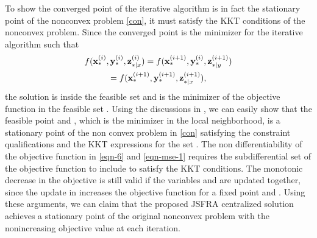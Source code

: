 To show the converged point of the iterative algorithm is in fact the stationary point of the nonconvex problem \eqref{con}, it must satisfy the \ac{KKT} conditions of the nonconvex problem. Since the converged point is the minimizer for the iterative algorithm such that 
\begin{multline} \label{con-opt}
f(\iter{\mx}{\ast}{i},\iter{\my}{\ast}{i},\iter{\mz}{\ast|x}{i}) = f(\iter{\mx}{\ast}{i+1},\iter{\my}{\ast}{i},\iter{\mz}{\ast|y}{i+1}) \\ = 
f(\iter{\mx}{\ast}{i+1},\iter{\my}{\ast}{i+1},\iter{\mz}{\ast|x}{i+1}),
\end{multline}
the solution is inside the feasible set  and  is the minimizer of the objective function  in the feasible set . Using the discussions in \cite{marks1978technical}, we can easily show that the feasible point  and , which is the minimizer in the local neighborhood, is a stationary point of the non convex problem in \eqref{con} satisfying the constraint qualifications and the \ac{KKT} expressions for the set . The non differentiability of the objective function in \eqref{eqn-6} and \eqref{eqn-mse-1} requires the subdifferential set of the objective function to include  to satisfy the \ac{KKT} conditions. The monotonic decrease in the objective is still valid if the variables \me{\mx,\my} and \me{\mz} are updated together, since the update in \me{\my} increases the objective function for a fixed point \me{\mx} and \me{\mz}. Using these arguments, we can claim that the proposed \ac{JSFRA} centralized solution achieves a stationary point of the original nonconvex problem with the nonincreasing objective value at each iteration. 










